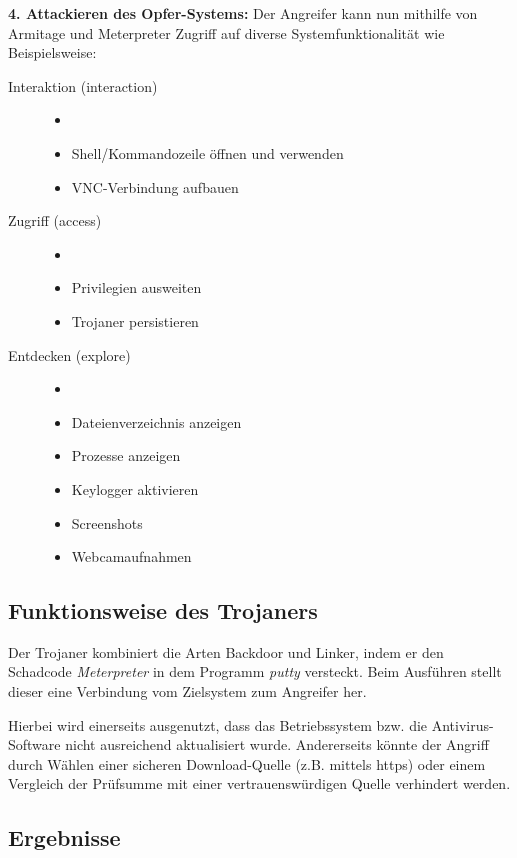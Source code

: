 \bigskip
\textbf{4. Attackieren des Opfer-Systems: }
Der Angreifer kann nun mithilfe von Armitage und Meterpreter Zugriff auf diverse Systemfunktionalität wie Beispielsweise:
\begin{description}
	\item[Interaktion (interaction)]
		\begin{itemize}
			\item[]  
			\item Shell/Kommandozeile öffnen und verwenden
			\item VNC-Verbindung aufbauen
		\end{itemize}
	\item[Zugriff (access)]
		\begin{itemize}
			\item[]
			\item Privilegien ausweiten
			\item Trojaner persistieren
		\end{itemize}
	\item[Entdecken (explore)]  
		\begin{itemize}
			\item[]  
			\item Dateienverzeichnis anzeigen
			\item Prozesse anzeigen
			\item Keylogger aktivieren
			\item Screenshots
			\item Webcamaufnahmen 
		\end{itemize}
\end{description}

\subsection{Funktionsweise des Trojaners}\label{sec:praktischeDurchfuehrung-funktionsweise}
Der Trojaner kombiniert die Arten Backdoor und Linker, indem er den Schadcode \textit{Meterpreter} 
in dem Programm \textit{putty} versteckt.
Beim Ausführen stellt dieser eine Verbindung vom Zielsystem zum Angreifer her.

Hierbei wird einerseits ausgenutzt, dass das Betriebssystem bzw. die Antivirus-Software nicht ausreichend aktualisiert wurde.
Andererseits könnte der Angriff durch Wählen einer sicheren Download-Quelle (z.B. mittels https)
oder einem Vergleich der Prüfsumme mit einer vertrauenswürdigen Quelle verhindert werden.

\subsection{Ergebnisse}\label{sec:praktischeDurchfuehrung-ergebnisse}


